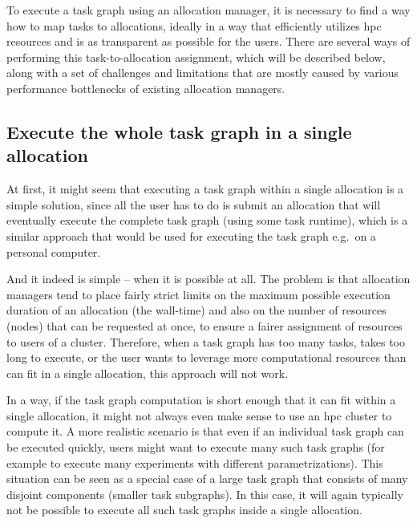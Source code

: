 To execute a task graph using an allocation manager, it is necessary to find a way how to map tasks
to allocations, ideally in a way that efficiently utilizes \gls{hpc} resources and
is as transparent as possible for the users. There are several ways of performing this
task-to-allocation assignment, which will be described below, along with a set of challenges and
limitations that are mostly caused by various performance bottlenecks of existing allocation
managers.

\subsection*{Execute the whole task graph in a single allocation}
At first, it might seem that executing a task graph within a single allocation is a simple
solution, since all the user has to do is submit an allocation that will eventually execute the
complete task graph (using some task runtime), which is a similar approach that would be used for
executing the task graph e.g.\ on a personal computer.

And it indeed is simple -- when it is possible at all. The problem is that allocation managers tend
to place fairly strict limits on the maximum possible execution duration of an allocation (the
wall-time) and also on the number of resources (nodes) that can be requested at once, to ensure a
fairer assignment of resources to users of a cluster. Therefore, when a task graph has too many
tasks, takes too long to execute, or the user wants to leverage more computational resources than
can fit in a single allocation, this approach will not work.

In a way, if the task graph computation is short enough that it can fit within a single allocation,
it might not always even make sense to use an \gls{hpc} cluster to compute it. A
more realistic scenario is that even if an individual task graph can be executed quickly, users
might want to execute many such task graphs (for example to execute many experiments with different
parametrizations). This situation can be seen as a special case of a large task graph that consists
of many disjoint components (smaller task subgraphs). In this case, it will again typically not be
possible to execute all such task graphs inside a single allocation.


